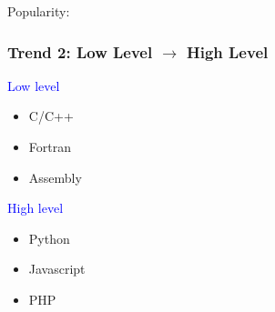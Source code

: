 \documentclass[
    xcolor={svgnames,dvipsnames},
    hyperref={colorlinks, citecolor=DeepPink4, linkcolor=DarkRed, urlcolor=DarkBlue}
    ]{beamer}  %
\newcommand{\blue}[1]{\textcolor{Blue}{\sf #1}}
\newcommand{\1}{\mathbbm 1}
\begin{document}
\begin{frame}

    Popularity:

    \begin{figure}
       \begin{center}
       \end{center}
    \end{figure}

\end{frame}



\begin{frame}
    \frametitle{Trend 2: Low Level $\to$ High Level}
    
    \blue{Low level} 
    
    \begin{itemize}
        \item C/C++
        \item Fortran
        \item Assembly
    \end{itemize}

    \vspace{1em}

    \blue{High level } 

    \begin{itemize}
        \item Python
        \item Javascript
        \item PHP
    \end{itemize}

\end{frame}
\end{document}
